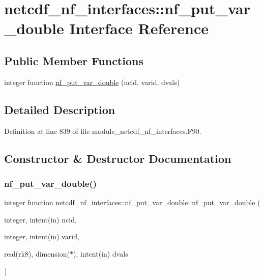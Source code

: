 \hypertarget{interfacenetcdf__nf__interfaces_1_1nf__put__var__double}{}\section{netcdf\+\_\+nf\+\_\+interfaces\+:\+:nf\+\_\+put\+\_\+var\+\_\+double Interface Reference}
\label{interfacenetcdf__nf__interfaces_1_1nf__put__var__double}
\subsection*{Public Member Functions}
\begin{DoxyCompactItemize}
\item 
integer function \hyperlink{interfacenetcdf__nf__interfaces_1_1nf__put__var__double_a3de8f758f9351f2a0409dd78cd6bbbba}{nf\+\_\+put\+\_\+var\+\_\+double} (ncid, varid, dvals)
\end{DoxyCompactItemize}


\subsection{Detailed Description}


Definition at line 839 of file module\+\_\+netcdf\+\_\+nf\+\_\+interfaces.\+F90.



\subsection{Constructor \& Destructor Documentation}
\mbox{\label{interfacenetcdf__nf__interfaces_1_1nf__put__var__double_a3de8f758f9351f2a0409dd78cd6bbbba}} 
\subsubsection{\texorpdfstring{nf\+\_\+put\+\_\+var\+\_\+double()}{nf\_put\_var\_double()}}
{\footnotesize\ttfamily integer function netcdf\+\_\+nf\+\_\+interfaces\+::nf\+\_\+put\+\_\+var\+\_\+double\+::nf\+\_\+put\+\_\+var\+\_\+double (\begin{DoxyParamCaption}\item[{integer, intent(in)}]{ncid,  }\item[{integer, intent(in)}]{varid,  }\item[{real(rk8), dimension($\ast$), intent(in)}]{dvals }\end{DoxyParamCaption})}



